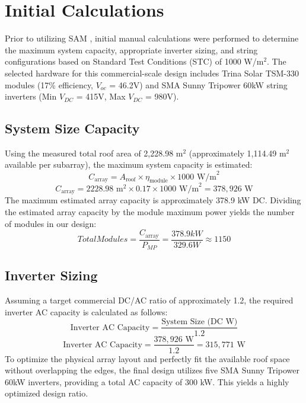 \documentclass[conference]{IEEEtran}
\begin{document}
\section{Initial Calculations}
Prior to utilizing SAM \cite{sam_software}, initial manual calculations were performed to determine the maximum system capacity, appropriate inverter sizing, and string configurations based on Standard Test Conditions (STC) of 1000 W/m$^2$. The selected hardware for this commercial-scale design includes Trina Solar TSM-330 modules (17\% efficiency, $V_{oc}$ = 46.2V) and SMA Sunny Tripower 60kW string inverters (Min $V_{DC}$ = 415V, Max $V_{DC}$ = 980V).

\subsection{System Size Capacity}
Using the measured total roof area of 2,228.98 m$^2$ (approximately 1,114.49 m$^2$ available per subarray), the maximum system capacity is estimated:
\begin{equation}
    C_{\text{array}} = A_{\text{roof}} \times \eta_{\text{module}} \times 1000 \text{ W/m}^2
\end{equation}
\begin{equation}
    C_{\text{array}} = 2228.98 \text{ m}^2 \times 0.17 \times 1000 \text{ W/m}^2 = 378,926 \text{ W}
\end{equation}
The maximum estimated array capacity is approximately 378.9 kW DC.
Dividing the estimated array capacity by the module maximum power yields the number of modules in our design:
\begin{equation}
    TotalModules = \frac{C_{\text{array}}}{P_{MP}} = \frac{378.9 kW}{329.6 W} \approx 1150 
\end{equation}
\subsection{Inverter Sizing}
Assuming a target commercial DC/AC ratio of approximately 1.2, the required inverter AC capacity is calculated as follows:
\begin{equation}
    \text{Inverter AC Capacity} = \frac{\text{System Size (DC W)}}{1.2}
\end{equation}
\begin{equation}
    \text{Inverter AC Capacity} = \frac{378,926 \text{ W}}{1.2} = 315,771 \text{ W}
\end{equation}
To optimize the physical array layout and perfectly fit the available roof space without overlapping the edges, the final design utilizes five SMA Sunny Tripower 60kW inverters, providing a total AC capacity of 300 kW. This yields a highly optimized design ratio.
\end{document}
